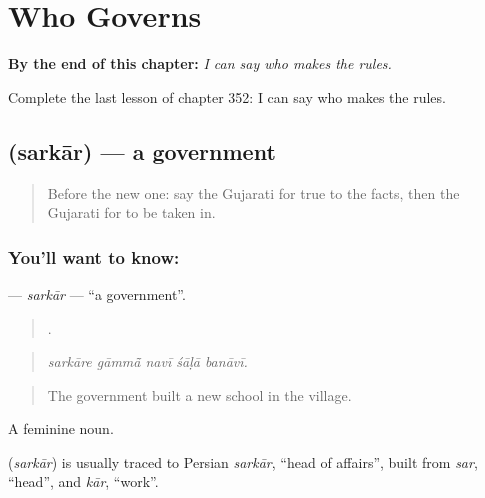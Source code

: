 
\chapter{Who Governs}
\label{ch:gu-who-governs}

\begin{chapteropening}
\textbf{By the end of this chapter:} \emph{I can say who makes the rules.}

Complete the last lesson of chapter 352: I can say who makes the rules.
\end{chapteropening}

\section[\texorpdfstring{\gu{સરકાર} (sarkār)}{સરકાર (sarkār)}]{ (sarkār) — a government}

\label{lesson:GU-C352-sarkar}



\begin{quote}
Before the new one: say the Gujarati for true to the facts, then the Gujarati for to be taken in.
\end{quote}

\subsection*{You'll want to know: }
\textbf{} — \emph{sarkār} — \textquotedblleft{}a government\textquotedblright{}.

\begin{quote}
    .
\end{quote}

\begin{quote}
\emph{sarkāre gāmmā̃ navī śāḷā banāvī.}
\end{quote}

\begin{quote}
The government built a new school in the village.
\end{quote}

A feminine noun.

\begin{cousinweb}
\textbf{} (\emph{sarkār}) is usually traced to Persian \emph{sarkār}, \textquotedblleft{}head of affairs\textquotedblright{}, built from \emph{sar}, \textquotedblleft{}head\textquotedblright{}, and \emph{kār}, \textquotedblleft{}work\textquotedblright{}.
\end{cousinweb}

